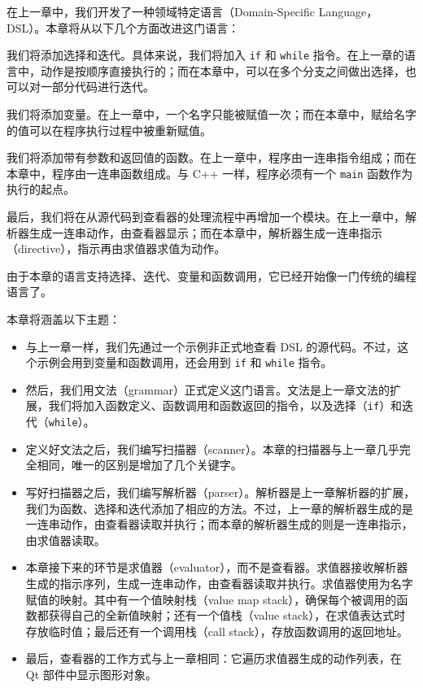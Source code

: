 \renewcommand{\codeInset}{63bp}
在上一章中，我们开发了一种领域特定语言（Domain-Specific Language，DSL）。本章将从以下几个方面改进这门语言：

我们将添加选择和迭代。具体来说，我们将加入 \texttt{if} 和 \texttt{while} 指令。在上一章的语言中，动作是按顺序直接执行的；而在本章中，可以在多个分支之间做出选择，也可以对一部分代码进行迭代。

我们将添加变量。在上一章中，一个名字只能被赋值一次；而在本章中，赋给名字的值可以在程序执行过程中被重新赋值。

我们将添加带有参数和返回值的函数。在上一章中，程序由一连串指令组成；而在本章中，程序由一连串函数组成。与 C++ 一样，程序必须有一个 \texttt{main} 函数作为执行的起点。

最后，我们将在从源代码到查看器的处理流程中再增加一个模块。在上一章中，解析器生成一连串动作，由查看器显示；而在本章中，解析器生成一连串指示（directive），指示再由求值器求值为动作。

由于本章的语言支持选择、迭代、变量和函数调用，它已经开始像一门传统的编程语言了。

本章将涵盖以下主题：

\begin{itemize}
\item 与上一章一样，我们先通过一个示例非正式地查看 DSL 的源代码。不过，这个示例会用到变量和函数调用，还会用到 \texttt{if} 和 \texttt{while} 指令。
\item 然后，我们用文法（grammar）正式定义这门语言。文法是上一章文法的扩展，我们将加入函数定义、函数调用和函数返回的指令，以及选择（\texttt{if}）和迭代（\texttt{while}）。
\item 定义好文法之后，我们编写扫描器（scanner）。本章的扫描器与上一章几乎完全相同，唯一的区别是增加了几个关键字。
\item 写好扫描器之后，我们编写解析器（parser）。解析器是上一章解析器的扩展，我们为函数、选择和迭代添加了相应的方法。不过，上一章的解析器生成的是一连串动作，由查看器读取并执行；而本章的解析器生成的则是一连串指示，由求值器读取。
\item 本章接下来的环节是求值器（evaluator），而不是查看器。求值器接收解析器生成的指示序列，生成一连串动作，由查看器读取并执行。求值器使用为名字赋值的映射。其中有一个值映射栈（value map stack），确保每个被调用的函数都获得自己的全新值映射；还有一个值栈（value stack），在求值表达式时存放临时值；最后还有一个调用栈（call stack），存放函数调用的返回地址。
\item 最后，查看器的工作方式与上一章相同：它遍历求值器生成的动作列表，在 Qt 部件中显示图形对象。
\end{itemize}


